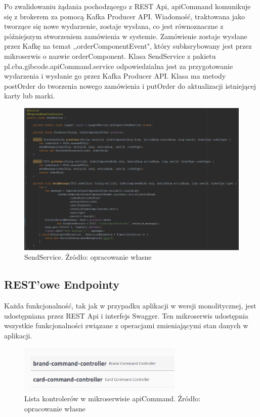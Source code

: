 Po zwalidowaniu żądania pochodzącego z REST Api, apiCommand komunikuje się z brokerem za pomocą Kafka Producer API. Wiadomość, traktowana jako tworzące się nowe wydarzenie, zostaje wysłana, co jest równoznaczne z późniejszym stworzeniem zamówienia w systemie. Zamówienie zostaje wysłane przez Kafkę na temat ,,orderComponentEvent", który subksrybowany jest przez mikroserwis o nazwie orderComponent. Klasa SendService z pakietu pl.cba.gibcode.apiCommand.service odpowiedzialna jest za przygotowanie wydarzenia i wysłanie go przez Kafka Producer API. Klasa ma metody postOrder do tworzenia nowego zamówienia i putOrder do aktualizacji istniejącej karty lub marki.
\begin{figure}[h!]
  \centering
    \includegraphics[width=1.0\textwidth]{images/SendService.JPG}
  \caption{SendService. Źródło: opracowanie własne }
\end{figure}
\FloatBarrier


\subsection{REST'owe Endpointy}
Każda funkcjonalność, tak jak w przypadku aplikacji w wersji monolitycznej, jest udostępniana przez REST Api i interfejs Swagger.
Ten mikroserwis udostępnia wszystkie funkcjonalności związane z operacjami zmieniającymi stan danych w aplikacji.

\begin{figure}[h!]
  \centering
    \includegraphics[width=0.7\textwidth]{images/controllerlistApiCommand.JPG}
  \caption{Lista kontrolerów w mikroserwisie apiCommand. Źródło: opracowanie własne }
\end{figure}
\FloatBarrier

